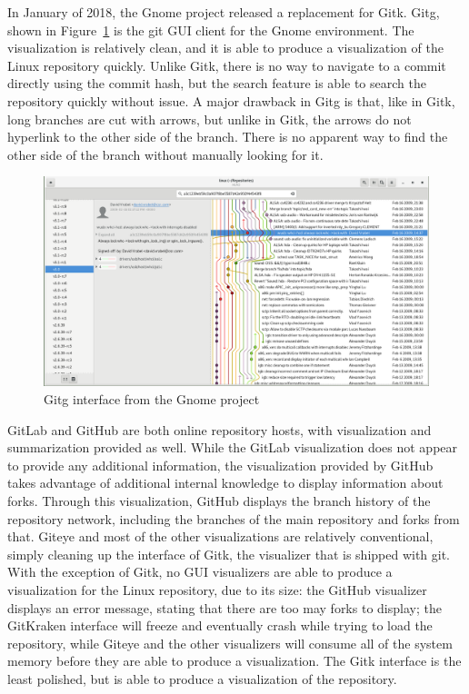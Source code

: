 In January of 2018, the Gnome project released a replacement for Gitk.
Gitg, shown in Figure~\ref{fig:gitg_screenshot} is the git GUI client
for the Gnome environment. The visualization is relatively clean, and it
is able to produce a visualization of the Linux repository quickly.
Unlike Gitk, there is no way to navigate to a commit directly using the
commit hash, but the search feature is able to search the repository
quickly without issue. A major drawback in Gitg is that, like in Gitk,
long branches are cut with arrows, but unlike in Gitk, the arrows do not
hyperlink to the other side of the branch. There is no apparent way to
find the other side of the branch without manually looking for it.

\begin{figure}[htpb]
  \centering
  \includegraphics[width=0.8\linewidth]{Figures/introduction/gitg.png}
  \caption{Gitg interface from the Gnome project}
  \label{fig:gitg_screenshot}
\end{figure}


GitLab and GitHub are both online repository hosts, with
visualization and summarization provided as well. While the GitLab
visualization does not appear to provide any additional information, the
visualization provided by GitHub takes advantage of additional internal
knowledge to display information about forks. Through this
visualization, GitHub displays the branch history of the repository
network, including the branches of the main repository and forks from
that. Giteye and most of the other visualizations are relatively
conventional, simply cleaning up the interface of Gitk, the visualizer
that is shipped with git. With the exception of Gitk, no GUI visualizers
are able to produce a visualization for the Linux repository, due to its
size: the GitHub visualizer displays an error message, stating that
there are too may forks to display; the GitKraken interface will freeze
and eventually crash while trying to load the repository, while Giteye
and the other visualizers will consume all of the system memory before
they are able to produce a visualization. The Gitk interface is the
least polished, but is able to produce a visualization of the
repository.

